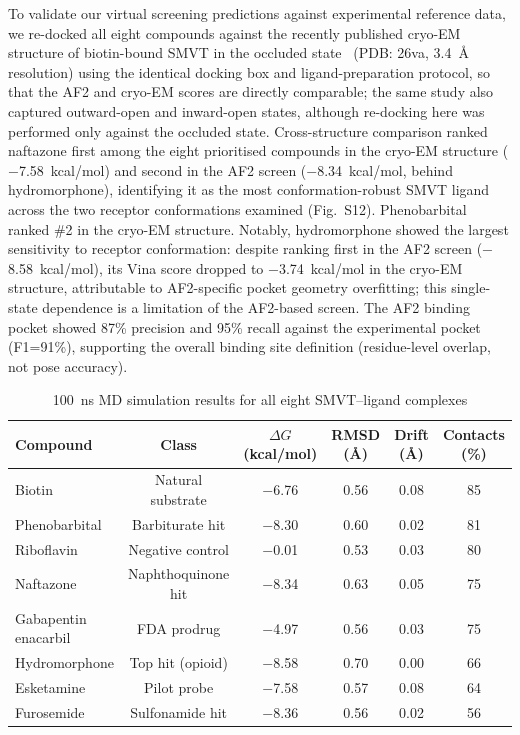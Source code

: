 \documentclass[10pt,letterpaper]{article}
\begin{document}
To validate our virtual screening predictions against experimental reference data, we re-docked all eight compounds against the recently published cryo-EM structure of biotin-bound SMVT in the occluded state~\cite{zhen2026} (PDB: 26va, 3.4~\AA{} resolution) using the identical docking box and ligand-preparation protocol, so that the AF2 and cryo-EM scores are directly comparable; the same study also captured outward-open and inward-open states, although re-docking here was performed only against the occluded state. Cross-structure comparison ranked naftazone first among the eight prioritised compounds in the cryo-EM structure ($-$7.58~kcal/mol) and second in the AF2 screen ($-$8.34~kcal/mol, behind hydromorphone), identifying it as the most conformation-robust SMVT ligand across the two receptor conformations examined (Fig.~S12). Phenobarbital ranked \#2 in the cryo-EM structure. Notably, hydromorphone showed the largest sensitivity to receptor conformation: despite ranking first in the AF2 screen ($-$8.58~kcal/mol), its Vina score dropped to $-$3.74~kcal/mol in the cryo-EM structure, attributable to AF2-specific pocket geometry overfitting; this single-state dependence is a limitation of the AF2-based screen. The AF2 binding pocket showed 87\% precision and 95\% recall against the experimental pocket (F1=91\%), supporting the overall binding site definition (residue-level overlap, not pose accuracy).

\begin{table}[t]
\centering
\caption{100~ns MD simulation results for all eight SMVT--ligand complexes}
\label{tab:md}
\footnotesize
\begin{tabular}{lccccc}
\toprule
Compound & Class & $\Delta G$ (kcal/mol) & RMSD (\AA{}) & Drift (\AA{}) & Contacts (\%) \\
\midrule
Biotin & Natural substrate & $-$6.76 & 0.56 & 0.08 & 85 \\
Phenobarbital & Barbiturate hit & $-$8.30 & 0.60 & 0.02 & 81 \\
Riboflavin & Negative control & $-$0.01 & 0.53 & 0.03 & 80 \\
Naftazone & Naphthoquinone hit & $-$8.34 & 0.63 & 0.05 & 75 \\
Gabapentin enacarbil & FDA prodrug & $-$4.97 & 0.56 & 0.03 & 75 \\
Hydromorphone & Top hit (opioid) & $-$8.58 & 0.70 & 0.00 & 66 \\
Esketamine & Pilot probe & $-$7.58 & 0.57 & 0.08 & 64 \\
Furosemide & Sulfonamide hit & $-$8.36 & 0.56 & 0.02 & 56 \\
\bottomrule
\end{tabular}
\end{table}
\end{document}

